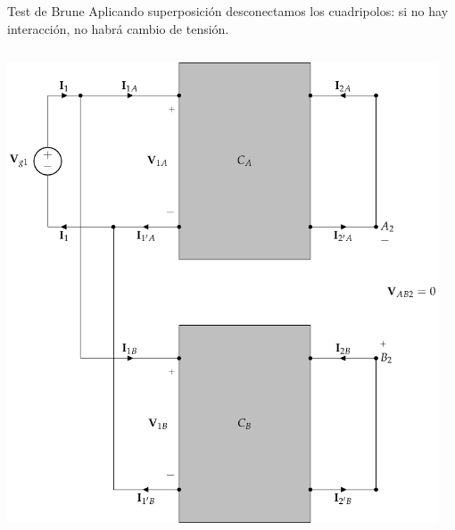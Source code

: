 \documentclass[aspectratio=169, usenames,svgnames,dvipsnames]{beamer}
\begin{document}
\begin{frame}[label={sec:org43fd4ac},plain]{Test de Brune}
Aplicando superposición desconectamos los cuadripolos: \alert{si no hay interacción, no habrá cambio de tensión}.
\begin{columns}
\begin{column}{0.5\columnwidth}
\begin{center}
\includegraphics[height=0.8\textheight]{../figs/paralelo-paralelo-brune-entrada2.pdf}
\end{center}
\end{column}
\begin{column}{0.5\columnwidth}
\begin{center}

\end{center}
\end{column}
\end{columns}
\end{frame}
\end{document}
